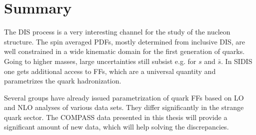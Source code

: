 \section{Summary}

The DIS process is a very interesting channel for the study of the nucleon structure. The spin averaged PDFs, mostly determined from inclusive DIS, are well constrained in a wide kinematic domain for the first generation of quarks. Going to higher masses, large uncertainties still subsist e.g. for $s$ and $\bar{s}$. In SIDIS one gets additional access to FFs, which are a universal quantity and parametrizes the quark hadronization.

Several groups have already issued parametrization of quark FFs based on LO and NLO analyses of various data sets. They differ significantly in the strange quark sector. The COMPASS data presented in this thesis will provide a significant amount of new data, which will help solving the discrepancies.
